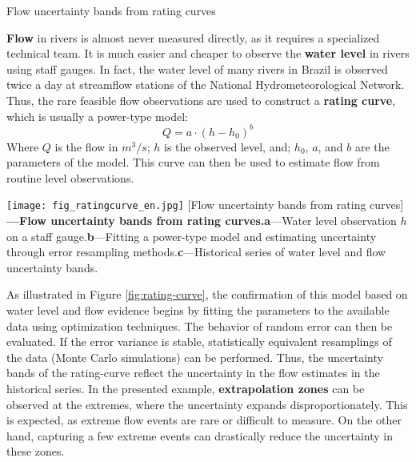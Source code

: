 \documentclass[./main_en.tex]{subfiles}
\begin{document}
\begin{simplebox}[
    float=htb,
    label={destaque_curvas_chave},
    nameref={Rating Curves}
    ]{Flow uncertainty bands from rating curves}
    \footnotesize
    \begin{minipage}[t]{\linewidth}    
    \par \textbf{Flow} in rivers is almost never measured directly, as it requires a specialized technical team. It is much easier and cheaper to observe the \textbf{water level} in rivers using staff gauges. In fact, the water level of many rivers in Brazil is observed twice a day at streamflow stations of the National Hydrometeorological Network. Thus, the rare feasible flow observations are used to construct a \textbf{rating curve}, which is usually a power-type \gls{model}:
    \begin{equation*} %
    		\label{eq:rating_curve}
    		Q = a \cdot (h - h_0)^b
    \end{equation*}
    Where $Q$ is the flow in $m^{3}/s$; $h$ is the observed level, and; $h_0$, $a$, and $b$ are the \gls{parameters} of the \gls{model}. This curve can then be used to estimate flow from routine level observations.
    \end{minipage}
    \begin{minipage}[t]{\linewidth}
        \begin{minipage}[t]{\linewidth}
        \vspace*{5pt}
        	\texttt{[image: fig\_ratingcurve\_en.jpg]}		
        	[Flow uncertainty bands from rating curves]{
                \textbf{---\;Flow uncertainty bands from rating curves.}\;\textbf{a}\;---\;Water level observation $h$ on a staff gauge.\;\textbf{b}\;---\;Fitting a power-type \gls{model} and estimating uncertainty through error resampling methods.\;\textbf{c}\;---\;Historical series of water level and flow uncertainty bands.
        	}
            \label{fig:rating-curve}  %
        \vspace*{5pt}
    \end{minipage}
    \end{minipage}
    \begin{minipage}[t]{\linewidth}
    \par As illustrated in Figure \ref{fig:rating-curve}, the confirmation of this \gls{model} based on water level and flow evidence begins by fitting the \gls{parameters} to the available data using optimization techniques. The behavior of random error can then be evaluated. If the error variance is stable, statistically equivalent resamplings of the data (Monte Carlo simulations) can be performed. Thus, the uncertainty bands of the \gls{rating-curve} reflect the uncertainty in the flow estimates in the historical series. In the presented example, \textbf{extrapolation zones} can be observed at the extremes, where the uncertainty expands disproportionately. This is expected, as extreme flow events are rare or difficult to measure. On the other hand, capturing a few extreme events can drastically reduce the uncertainty in these zones.

\end{minipage}
\end{simplebox}
\end{document}
